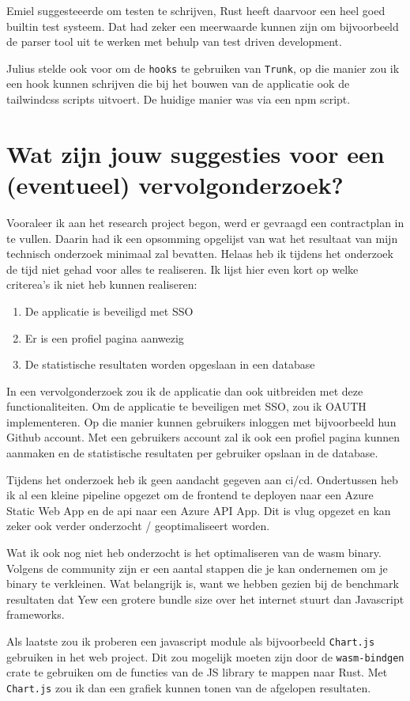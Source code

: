 Emiel suggesteeerde om testen te schrijven, Rust heeft daarvoor een heel goed builtin test systeem.
Dat had zeker een meerwaarde kunnen zijn om bijvoorbeeld de parser tool uit te werken met behulp van
test driven development.

Julius stelde ook voor om de \texttt{hooks} te gebruiken van \texttt{Trunk}, op
die manier zou ik een hook kunnen schrijven die bij het bouwen van de applicatie ook de tailwindcss
scripts uitvoert. De huidige manier was via een npm script.

\section{Wat zijn jouw suggesties voor een (eventueel) vervolgonderzoek?}

Vooraleer ik aan het research project begon, werd er gevraagd een contractplan in te vullen. 
Daarin had ik een opsomming opgelijst van wat het resultaat van mijn technisch onderzoek minimaal
zal bevatten. Helaas heb ik tijdens het onderzoek de tijd niet gehad voor alles te realiseren. 
Ik lijst hier even kort op welke criterea's ik niet heb kunnen realiseren:
\begin{enumerate}
  \item De applicatie is beveiligd met SSO
  \item Er is een profiel pagina aanwezig
  \item De statistische resultaten worden opgeslaan in een database
\end{enumerate}
In een vervolgonderzoek zou ik de applicatie dan ook uitbreiden met deze functionaliteiten. Om de
applicatie te beveiligen met SSO, zou ik OAUTH implementeren. Op die manier kunnen gebruikers
inloggen met bijvoorbeeld hun Github account.  Met een gebruikers account zal ik ook een profiel
pagina kunnen aanmaken en de statistische resultaten per gebruiker opslaan in de database.

Tijdens het onderzoek heb ik geen aandacht gegeven aan ci/cd. Ondertussen heb ik al een kleine
pipeline opgezet om de frontend te deployen naar een Azure Static Web App en de api naar een Azure
API App. Dit is vlug opgezet en kan zeker ook verder onderzocht / geoptimaliseert worden.

Wat ik ook nog niet heb onderzocht is het optimaliseren van de wasm binary.\cite{wasm_size} Volgens
de community zijn er een aantal stappen die je kan ondernemen om je binary te verkleinen. Wat
belangrijk is, want we hebben gezien bij de benchmark resultaten dat Yew een grotere bundle size
over het internet stuurt dan Javascript frameworks.

Als laatste zou ik proberen een javascript module als bijvoorbeeld \texttt{Chart.js}
gebruiken in het web project. Dit zou mogelijk moeten zijn door de \texttt{wasm-bindgen}
crate te gebruiken om de functies van de JS library te mappen naar Rust. Met
\texttt{Chart.js} zou ik dan een grafiek kunnen tonen van de afgelopen resultaten.
